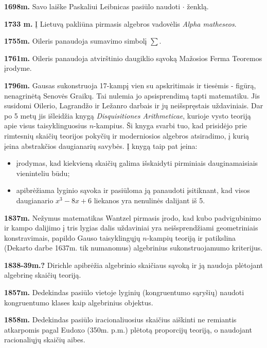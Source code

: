 \documentclass{article}
\begin{document}
\textbf{1698m.} Savo laiške Paskaliui Leibnicas pasiūlo naudoti $\cdot$ ženklą.

\textbf{1733 m.} Į Lietuvą pakliūna pirmasis algebros vadovėlis \textit{Alpha matheseos}.

\textbf{1755m.} Oileris panaudoja sumavimo simbolį $\sum$.

\textbf{1761m.} Oileris panaudoja atvirštinio daugiklio sąvoką Mažosios Ferma Teoremos įrodyme.

\textbf{1796m.} Gausas sukonstruoja 17-kampį vien su apskritimais ir tiesėmis - figūrą, nenagrinėtą Senovės Graikų. Tai nulemia jo apsisprendimą tapti matematiku. Jis susidomi Oilerio, Lagrandžo ir Ležanro darbais ir jų neišspręstais uždaviniais. Dar po 5 metų jis išleidžia knygą \textit{Disquisitiones Arithmeticae}, kurioje vysto teoriją apie visus taisyklinguosius $n$-kampius. Ši knyga svarbi tuo, kad prisidėjo prie rimtesnių skaičių teorijos pokyčių ir moderniosios algebros atsiradimo, į kurią įeina abstrakčios daugianarių savybės. Į knygą taip pat įeina:
\begin{itemize}
\item įrodymas, kad kiekvieną skaičių galima išskaidyti pirminiais dauginamaisiais vieninteliu būdu;
\item apibrėžiama lyginio sąvoka ir pasiūloma ją panaudoti įsitiknant, kad visos daugianario $x^3-8x+6$ liekanos yra nenulinės dalijant iš 5.
\end{itemize}

\textbf{1837m.} Nežymus matematikas Wantzel pirmasis įrodo, kad kubo padvigubinimo ir kampo dalijimo į tris lygias dalis uždaviniai yra neišsprendžiami geometriniais konstravimais, papildo Gauso taisyklingųjų $n$-kampių teoriją ir patikslina (Dekarto darbe 1637m. tik numanomus) algebrinius sukonstruojamumo kriterijus.

\textbf{1838-39m.?} Dirichle apibrėžia algebrinio skaičiaus sąvoką ir ją naudoja plėtojant algebrinę skaičių teoriją.

\textbf{1857m.} Dedekindas pasiūlo vietoje lyginių (kongruentumo sąryšių) naudoti kongruentumo klases kaip algebrinius objektus.

\textbf{1858m.} Dedekindas pasiūlo iracionaliuosius skaičius aiškinti ne remiantis atkarpomis pagal Eudoxo (350m. p.m.) plėtotą proporcijų teoriją, o naudojant racionaliųjų skaičių aibes.
\end{document}
